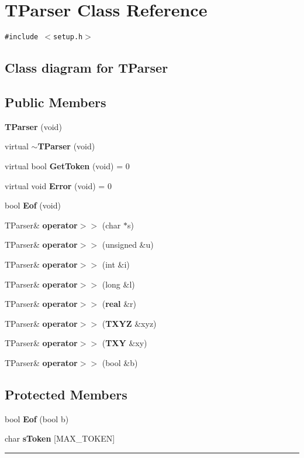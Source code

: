 \section{TParser  Class Reference}
\label{TParser}


{\tt \#include $<$setup.h$>$}

\subsection*{Class diagram for TParser}
\begin{figure}[H]
\begin{center}
\leavevmode
\setlength{\epsfysize}{2cm}
\end{center}
\end{figure}
\subsection*{Public Members}
\begin{CompactItemize}
\item 
{\bf TParser} (void)
\item 
virtual {\bf $\sim$TParser} (void)
\item 
virtual bool {\bf Get\-Token} (void) = 0
\item 
virtual void {\bf Error} (void) = 0
\item 
bool {\bf Eof} (void)
\item 
TParser\& {\bf operator$>$$>$} (char $\ast$s)
\item 
TParser\& {\bf operator$>$$>$} (unsigned \&u)
\item 
TParser\& {\bf operator$>$$>$} (int \&i)
\item 
TParser\& {\bf operator$>$$>$} (long \&l)
\item 
TParser\& {\bf operator$>$$>$} ({\bf real} \&r)
\item 
TParser\& {\bf operator$>$$>$} ({\bf TXYZ} \&xyz)
\item 
TParser\& {\bf operator$>$$>$} ({\bf TXY} \&xy)
\item 
TParser\& {\bf operator$>$$>$} (bool \&b)
\end{CompactItemize}
\subsection*{Protected Members}
\begin{CompactItemize}
\item 
bool {\bf Eof} (bool b)
\item 
char {\bf s\-Token} [MAX\_\-TOKEN]
\end{CompactItemize}
\vspace{0.4cm}\hrule\vspace{0.2cm}
